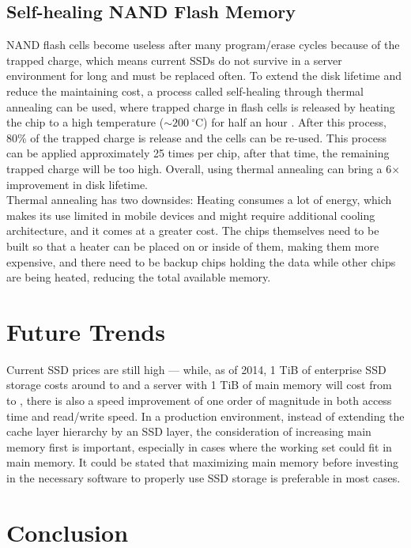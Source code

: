 \documentclass{acm_proc_article-sp}
\begin{document}
\subsection{Self-healing NAND Flash Memory}
NAND flash cells become useless after many program/erase cycles because of the trapped charge, which means current SSDs do not survive in a server environment for long and must be replaced often. To extend the disk lifetime and reduce the maintaining cost, a process called self-healing through thermal annealing can be used, where trapped charge in flash cells is released by heating the chip to a high temperature ($\sim 200~^{\circ}$C) for half an hour \cite{wu2011exploiting}. After this process, 80\% of the trapped charge is release and the cells can be re-used. This process can be applied approximately 25 times per chip, after that time, the remaining trapped charge will be too high. Overall, using thermal annealing can bring a 6$\times$ improvement in disk lifetime.
\\
Thermal annealing has two downsides: Heating consumes a lot of energy, which makes its use limited in mobile devices and might require additional cooling architecture, and it comes at a greater cost. The chips themselves need to be built so that a heater can be placed on or inside of them, making them more expensive, and there need to be backup chips holding the data while other chips are being heated, reducing the total available memory.

\section{Future Trends}
Current SSD prices are still high --- while, as of 2014, 1 TiB of enterprise SSD storage costs around  to  and a server with 1 TiB of main memory will cost from  to , there is also a speed improvement of one order of magnitude in both access time and read/write speed. In a production environment, instead of extending the cache layer hierarchy by an SSD layer, the consideration of increasing main memory first is important, especially in cases where the working set could fit in main memory. It could be stated that maximizing main memory before investing in the necessary software to properly use SSD storage is preferable in most cases.

\section{Conclusion}





\balancecolumns
\end{document}
